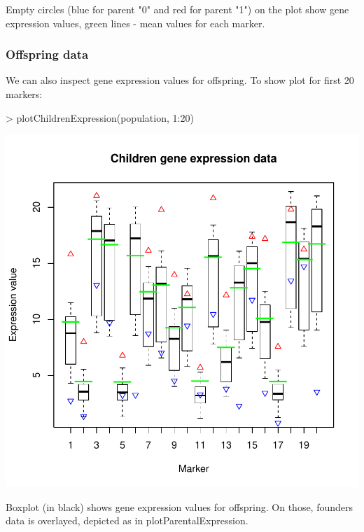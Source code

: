 \documentclass{article}
\begin{document}
{\noindent}Empty circles (blue for parent "0" and red for parent "1") on the plot show gene expression values, green lines - mean values for each marker.
\newpage
\subsubsection{Offspring data}
We can also inspect gene expression values for offspring. To show plot for first 20 markers:
\begin{Schunk}
\begin{Sinput}
> plotChildrenExpression(population, 1:20)
\end{Sinput}
\end{Schunk}
\includegraphics{manual-007}

{\noindent}Boxplot (in black) shows gene expression values for offspring. On those, founders data is overlayed, depicted as in plotParentalExpression.
\newpage
\end{document}
